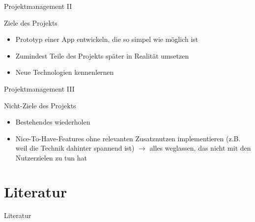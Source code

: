 \documentclass[presentation,bigger,aspectratio=169]{beamer}
\begin{document}
\begin{frame}[label={sec:org889962c}]{Projektmanagement II}
\begin{block}{Ziele des Projekts}
\begin{itemize}
\item Prototyp einer App entwickeln, die so simpel wie möglich ist
\item Zumindest Teile des Projekts später in Realität umsetzen
\item Neue Technologien kennenlernen
\end{itemize}
\end{block}
\end{frame}
\begin{frame}[label={sec:org5ed4ddd}]{Projektmanagement III}
\begin{block}{Nicht-Ziele des Projekts}
\begin{itemize}
\item Bestehendes wiederholen
\item Nice-To-Have-Features ohne relevanten Zusatznutzen implementieren (z.B. weil
die Technik dahinter spannend ist) \(\to\) alles weglassen, das nicht mit
den Nutzerzielen zu tun hat
\end{itemize}
\end{block}
\end{frame}

\section*{Literatur}
\label{sec:orgc6559f0}
\begin{frame}[allowframebreaks]{Literatur}
\printbibliography[heading=none]
\end{frame}
\appendix
\end{document}
